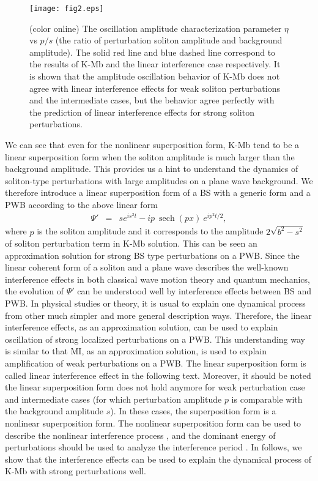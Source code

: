 \documentclass[aps,twocolumn,showpacs]{revtex4}
\DeclareMathOperator{\sech}{sech}
\begin{document}
  \begin{figure}[htb]
\centering
\label{fig:2}
{\texttt{[image: fig2.eps]}}
\caption{(color online) The oscillation amplitude characterization parameter $\eta$ vs $p/s$ (the ratio of perturbation soliton amplitude and background amplitude). The solid red line and blue dashed line correspond to the results of K-Mb and the linear interference case respectively. It is shown that the amplitude oscillation behavior of K-Mb does not agree with linear interference effects for weak soliton perturbations and the  intermediate cases, but the behavior agree perfectly with the prediction of linear interference effects for strong soliton perturbations. }
\end{figure}


We can see that even for the nonlinear superposition form, K-Mb tend to be a linear superposition form when the soliton amplitude is much larger than the background amplitude. This provides us a hint to understand the dynamics of soliton-type perturbations with large amplitudes on a plane wave background. We therefore introduce a linear superposition form of a BS with a generic form and a PWB according to the above linear form
 \begin{eqnarray}
\Psi'&=& s  e^{i s^2 t}- i p \  \sech(p x)\ e^{i  p^2 t/2},
\end{eqnarray}
 where $p$ is the soliton amplitude and it corresponds to the amplitude  $2 \sqrt{b^2-s^2}$ of soliton perturbation term in K-Mb solution. This can be seen an approximation solution for strong BS type perturbations on a PWB. Since the linear coherent form of a soliton and a plane wave describes the well-known interference effects in both classical wave motion theory and quantum mechanics, the evolution of $\Psi'$ can be understood well by interference effects between BS and PWB.  In physical studies or theory,  it is usual to   explain one dynamical process from other much simpler and more general description ways. Therefore, the linear interference effects, as an approximation solution, can be used to explain oscillation of strong localized perturbations on a PWB. This understanding way is similar to that MI, as an approximation solution, is used to explain amplification of weak perturbations on a PWB.  The linear superposition form is called linear  interference effect in the following text. Moreover, it should be noted the linear superposition form does not hold anymore for weak perturbation case and  intermediate cases (for which  perturbation amplitude $p$ is comparable with the background amplitude $s$). In these cases, the superposition form is a nonlinear superposition form. The nonlinear superposition form can be used to describe the  nonlinear interference process \cite{nodyzhao}, and the dominant energy of perturbations should be used to analyze the interference period \cite{zhaoling}.   In follows, we show that the interference effects can be used to explain the dynamical process of K-Mb with strong perturbations well.
\end{document}
